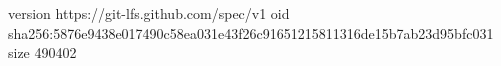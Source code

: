 version https://git-lfs.github.com/spec/v1
oid sha256:5876e9438e017490c58ea031e43f26c91651215811316de15b7ab23d95bfc031
size 490402
